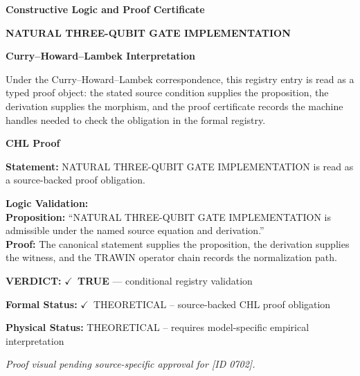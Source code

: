 \clearpage
\begingroup\tzpsupportsetup
\noindent\textbf{\fontsize{10.8pt}{12.8pt}\selectfont [ID 0702] Constructive Logic and Proof Certificate}\par
\noindent\textbf{\fontsize{10pt}{12pt}\selectfont NATURAL THREE-QUBIT GATE IMPLEMENTATION}\par
\vspace{0.45em}
\begingroup
\footnotesize
\setlength{\parskip}{0.22em}
\setlength{\parindent}{0pt}
\noindent\textbf{Curry--Howard--Lambek Interpretation}\par
Under the Curry--Howard--Lambek correspondence, this registry entry is read as a typed proof
object: the stated source condition supplies the proposition, the derivation supplies the
morphism, and the proof certificate records the machine handles needed to check the obligation
in the formal registry.

\vspace{0.45em}
\noindent\textbf{CHL Proof}\par
\textbf{Statement:} NATURAL THREE-QUBIT GATE IMPLEMENTATION is read as a source-backed proof obligation.

\textbf{Logic Validation:}\\
\textbf{Proposition:} ``NATURAL THREE-QUBIT GATE IMPLEMENTATION is admissible under the named source equation and derivation.''\\
\textbf{Proof:} The canonical statement supplies the proposition, the derivation supplies the witness, and the TRAWIN operator chain records the normalization path.

\textbf{VERDICT:} \ensuremath{\checkmark}\ \textbf{TRUE} --- conditional registry validation

\textbf{Formal Status:} \ensuremath{\checkmark}\ THEORETICAL -- source-backed CHL proof obligation

\textbf{Physical Status:} THEORETICAL -- requires model-specific empirical interpretation
\par\vspace{0.45em}
\par
\vfill
\begingroup\footnotesize\itshape
Proof visual pending source-specific approval for [ID 0702].
\par\endgroup
\vfill
\endgroup
\endgroup

